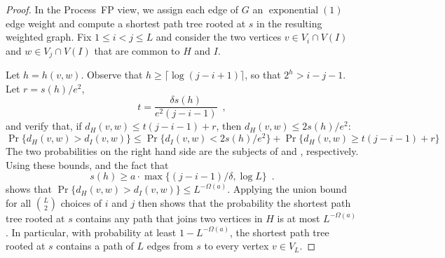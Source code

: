 \documentclass[lotsofwhite]{patmorin}
\DeclareMathOperator{\exponential}{exponential}
\begin{document}
\begin{proof}
  In the Process~FP view, we assign each edge of $G$ an $\exponential(1)$
  edge weight and compute a shortest path tree rooted at $s$ in the
  resulting weighted graph.  Fix $1\le i< j\le L$ and consider the two
  vertices $v\in V_i\cap V(I)$ and $w\in V_j\cap V(I)$ that are common
  to $H$ and $I$.  

  Let $h=h(v,w)$.  Observe that $h \ge \lceil\log (j-i+1)\rceil$, so
  that $2^h > i-j-1$.
  Let $r=s(h)/e^2$,
  \[
      t = \frac{\delta s(h)}{e^2(j-i-1)} \enspace , 
  \]
  and verify that, if $d_H(v,w) \le t(j-i-1) + r$, then $d_H(v,w) \le 2s(h)/e^2$:
  \[
     \Pr\{d_H(v,w) > d_I(v,w)\} \le \Pr\{d_I(v,w) < 2s(h)/e^2\}
            + \Pr\{d_H(v,w) \ge t(j-i-1)+ r \}
  \] 
  The two probabilities on the right hand side are the subjects of
   and , respectively.
  Using these bounds, and the fact that
  \[
      s(h) \ge a\cdot \max\{(j-i-1)/\delta, \log L\} \enspace .
  \]
  shows that $\Pr\{d_H(v,w) > d_I(v,w)\} \le L^{-\Omega(a)}$.
  Applying the union bound for all $\binom{L}{2}$ choices of $i$ and $j$
  then shows that the probability the shortest path tree rooted at $s$
  contains any path that joins two vertices in $H$ is at most $L^{-\Omega(a)}$.
  In particular, with probability at least $1-L^{-\Omega(a)}$, the shortest
  path tree rooted at $s$ contains a path of $L$ edges from $s$ to every vertex $v\in V_L$.
%
%
%
%   
%  
%
%

\end{proof}
\end{document}
